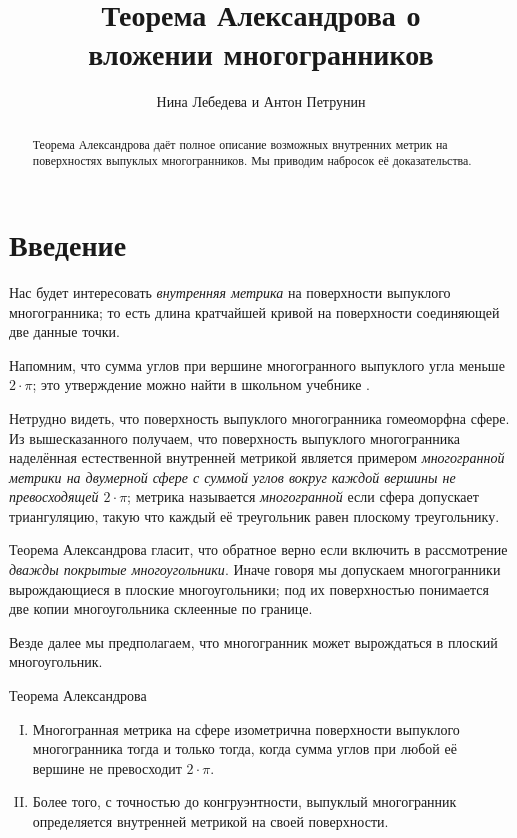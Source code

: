 \documentclass[oneside,a4paper]{article}
\begin{document}

\title{Теорема Александрова о\\ вложении многогранников}
\author{Нина Лебедева и Антон Петрунин}
\date{}
\maketitle

\begin{abstract}
Теорема Александрова даёт полное описание возможных внутренних метрик на поверхностях выпуклых многогранников.
Мы приводим набросок её доказательства.
\end{abstract}

\section{Введение}

Нас будет интересовать \emph{внутренняя метрика} на поверхности выпуклого многогранника;
то есть длина кратчайшей кривой на поверхности соединяющей две данные точки.

Напомним, что сумма углов при вершине многогранного выпуклого угла меньше $2\cdot \pi$; 
это утверждение можно найти в школьном учебнике \cite[§~325]{kiselyov}.

Нетрудно видеть, что поверхность выпуклого многогранника гомеоморфна сфере.
Из вышесказанного получаем, что поверхность выпуклого многогранника наделённая естественной внутренней метрикой
является примером \emph{многогранной метрики на двумерной сфере с суммой углов вокруг каждой вершины не превосходящей $2\cdot\pi$}; 
метрика называется \emph{многогранной} если сфера допускает триангуляцию, 
такую что каждый её треугольник равен плоскому треугольнику.

Теорема Александрова гласит, что обратное верно если включить в рассмотрение \emph{дважды покрытые многоугольники}.
Иначе говоря мы допускаем многогранники вырождающиеся в плоские многоугольники;
под их поверхностью понимается две копии многоугольника склеенные по границе.

Везде далее мы предполагаем, что многогранник может вырождаться в плоский многоугольник.

\begin{thm}{Теорема Александрова}
\begin{enumerate}[I.]
\item\label{thm:exist} Многогранная метрика на сфере изометрична поверхности выпуклого многогранника тогда и только тогда, когда сумма углов при любой её вершине не превосходит $2\cdot\pi$.

\item\label{thm:unique}
Более того, с точностью до конгруэнтности, выпуклый многогранник определяется внутренней метрикой на своей поверхности.
\end{enumerate}

\end{thm}
\end{document}
